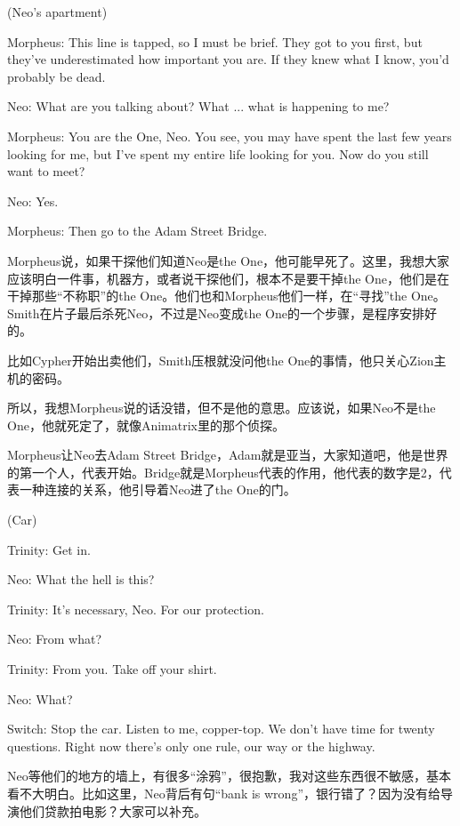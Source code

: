 \documentclass{ctexart}
\newenvironment{myquote}{\color{green} \setlength{\leftskip}{6em} \setlength{\rightskip}{4em} \setlength{\parindent}{-2em}}{\par}
\begin{document}
\begin{myquote}
(Neo's apartment)

Morpheus: This line is tapped, so I must be brief. They got to you first, but they've underestimated how important you are. If they knew what I know, you'd probably be dead.

Neo: What are you talking about? What ... what is happening to me?

Morpheus: You are the One, Neo. You see, you may have spent the last few years looking for me, but I've spent my entire life looking for you. Now do you still want to meet?

Neo: Yes.

Morpheus: Then go to the Adam Street Bridge.
\end{myquote}

Morpheus说，如果干探他们知道Neo是the One，他可能早死了。这里，我想大家应该明白一件事，机器方，或者说干探他们，根本不是要干掉the One，他们是在干掉那些“不称职”的the One。他们也和Morpheus他们一样，在“寻找”the One。Smith在片子最后杀死Neo，不过是Neo变成the One的一个步骤，是程序安排好的。

比如Cypher开始出卖他们，Smith压根就没问他the One的事情，他只关心Zion主机的密码。

所以，我想Morpheus说的话没错，但不是他的意思。应该说，如果Neo不是the One，他就死定了，就像Animatrix里的那个侦探。

Morpheus让Neo去Adam Street Bridge，Adam就是亚当，大家知道吧，他是世界的第一个人，代表开始。Bridge就是Morpheus代表的作用，他代表的数字是2，代表一种连接的关系，他引导着Neo进了the One的门。

\begin{myquote}
(Car)

Trinity: Get in.

Neo: What the hell is this?

Trinity: It's necessary, Neo. For our protection.

Neo: From what?

Trinity: From you. Take off your shirt.

Neo: What?

Switch: Stop the car. Listen to me, copper-top. We don't have time for twenty questions. Right now there's only one rule, our way or the highway.
\end{myquote}

Neo等他们的地方的墙上，有很多“涂鸦”，很抱歉，我对这些东西很不敏感，基本看不大明白。比如这里，Neo背后有句“bank is wrong”，银行错了？因为没有给导演他们贷款拍电影？大家可以补充。
\end{document}

